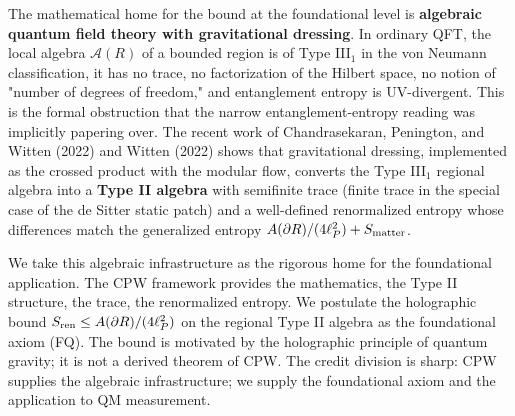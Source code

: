 \documentclass[11pt,a4paper]{article}
\begin{document}
The mathematical home for the bound at the foundational level is \textbf{algebraic quantum field theory with gravitational dressing}. In ordinary QFT, the local algebra $\mathcal{A}(R)$ of a bounded region is of Type III$_1$ in the von Neumann classification, it has no trace, no factorization of the Hilbert space, no notion of "number of degrees of freedom," and entanglement entropy is UV-divergent. This is the formal obstruction that the narrow entanglement-entropy reading was implicitly papering over. The recent work of Chandrasekaran, Penington, and Witten (2022) and Witten (2022) shows that gravitational dressing, implemented as the crossed product with the modular flow, converts the Type III$_1$ regional algebra into a \textbf{Type II algebra} with semifinite trace (finite trace in the special case of the de Sitter static patch) and a well-defined renormalized entropy whose differences match the generalized entropy $A(\partial R)/(4\ell_P^2) + S_{\rm matter}$.

We take this algebraic infrastructure as the rigorous home for the foundational application. The CPW framework provides the mathematics, the Type II structure, the trace, the renormalized entropy. We postulate the holographic bound $S_{\rm ren} \le A(\partial R)/(4\ell_P^2)$ on the regional Type II algebra as the foundational axiom (FQ). The bound is motivated by the holographic principle of quantum gravity; it is not a derived theorem of CPW. The credit division is sharp: CPW supplies the algebraic infrastructure; we supply the foundational axiom and the application to QM measurement.
\end{document}
